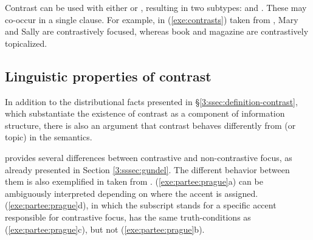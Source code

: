 Contrast can be used with either  or , resulting in two
subtypes:   and .  These may 
co-occur in a single clause. For example, in (\ref{exe:contrasts})
taken from \citet{van:05}, Mary and Sally are
contrastively focused, whereas book and magazine are
contrastively topicalized.




\subsection{Linguistic properties of contrast}
\label{3:ssec:properties-contrast}


In addition to the distributional facts presented in
\S\ref{3:ssec:definition-contrast}, which substantiate the existence
of contrast as a component of information structure, there is also an
argument that contrast behaves differently from 
(or topic) in the semantics.


\cite{gundel:99} provides several differences between contrastive
 and non-contrastive focus, as already presented in
Section \ref{3:sssec:gundel}.  The different behavior between them is also
exemplified in  taken from
\citet{partee:91}. (\ref{exe:partee:prague}a) can be ambiguously
interpreted depending on where the accent is
assigned. (\ref{exe:partee:prague}d), in which the subscript
 stands for a specific accent responsible for
contrastive focus, has the same truth-conditions as
(\ref{exe:partee:prague}c), but not
(\ref{exe:partee:prague}b).






